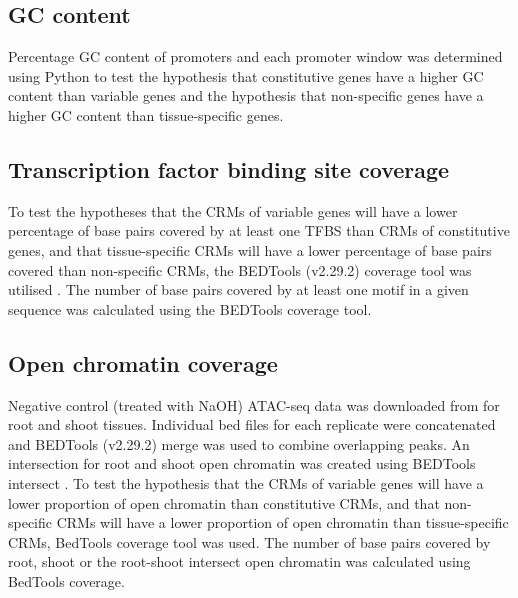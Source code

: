 \documentclass[../main.tex]{subfiles}
\begin{document}
\subsection{GC content}\label{chapter2:methods:gc-content}

Percentage GC content of promoters and each promoter window was determined using Python to test the hypothesis that constitutive genes have a higher GC content than variable genes and the hypothesis that non\hyp{}specific genes have a higher GC content than tissue\hyp{}specific genes.


\subsection{Transcription factor binding site coverage}{\label{chapter2:methods:transcription-factor-binding-site-coverage}}

To test the hypotheses that the CRMs of variable genes will have a lower percentage of base pairs covered by at least one TFBS than CRMs of constitutive genes, and that tissue\hyp{}specific CRMs will have a lower percentage of base pairs covered than non\hyp{}specific CRMs, the BEDTools (v2.29.2) coverage tool was utilised \autocite{quinlanBEDToolsFlexibleSuite2010}.
The number of base pairs covered by at least one motif in a given sequence was calculated using the BEDTools coverage tool.

\subsection{Open chromatin coverage}\label{chapter2:methods:open-chromatin-coverage}
Negative control (treated with NaOH) ATAC\hyp{}seq data was downloaded from \textcite{potterCytokininModulatesContextdependent2018} for root and shoot tissues.
Individual bed files for each replicate were concatenated and BEDTools (v2.29.2) merge \autocite{quinlanBEDToolsFlexibleSuite2010} was used to combine overlapping peaks.
An intersection for root and shoot open chromatin was created using BEDTools intersect \autocite{quinlanBEDToolsFlexibleSuite2010}.
To test the hypothesis that the CRMs of variable genes will have a lower proportion of open chromatin than constitutive CRMs, and that non\hyp{}specific CRMs will have a lower proportion of open chromatin than tissue\hyp{}specific CRMs, BedTools coverage tool \autocite{quinlanBEDToolsFlexibleSuite2010} was used.
The number of base pairs covered by root, shoot or the root\hyp{}shoot intersect open chromatin was calculated using BedTools coverage.
\end{document}
